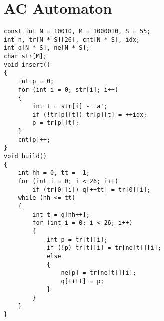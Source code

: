 \section{AC Automaton}
\begin{lstlisting}
const int N = 10010, M = 1000010, S = 55;
int n, tr[N * S][26], cnt[N * S], idx;
int q[N * S], ne[N * S];
char str[M];
void insert()
{
    int p = 0;
    for (int i = 0; str[i]; i++)
    {
        int t = str[i] - 'a';
        if (!tr[p][t]) tr[p][t] = ++idx;
        p = tr[p][t];
    }
    cnt[p]++;
}
void build()
{
    int hh = 0, tt = -1;
    for (int i = 0; i < 26; i++)
        if (tr[0][i]) q[++tt] = tr[0][i];
    while (hh <= tt)
    {
        int t = q[hh++];
        for (int i = 0; i < 26; i++)
        {
            int p = tr[t][i];
            if (!p) tr[t][i] = tr[ne[t]][i];
            else
            {
                ne[p] = tr[ne[t]][i];
                q[++tt] = p;
            }
        }
    }
}
\end{lstlisting}